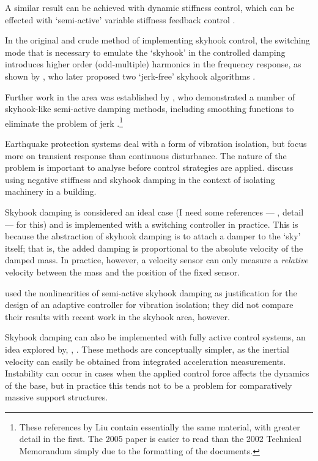 A similar result  can be achieved with dynamic stiffness control, which can be effected with `semi-active' variable stiffness feedback control \cite{leavitt2007}.

In the original and crude method of implementing skyhook control, the
switching mode that is necessary to emulate the `skyhook' in the controlled
damping introduces higher order (odd-multiple) harmonics in the frequency
response, as shown by \textcite{ahmadian2001}, who later proposed two
`jerk-free' skyhook algorithms \cite{ahmadian2004}.

Further work in the area was established by \textcite{liu2002}, who
demonstrated a number of skyhook-like semi-active damping methods, including
smoothing functions to eliminate the problem of jerk
\cite{liu2005}.\footnote{These references by Liu contain essentially the same
material, with greater detail in the first.
The 2005 paper is easier to read
than the 2002 Technical Memorandum simply due to the formatting of the
documents.}

Earthquake protection systems deal with a form of vibration isolation,
but focus more on transient response than continuous disturbance.
The
nature of the problem is important to analyse before control
strategies are applied.
\textcite{gavin2007} discuss using negative
stiffness and skyhook damping in the context of isolating machinery
in a building.

Skyhook damping is considered an ideal case (I need some references
— \ie, detail — for this) and is implemented with a switching
controller in practice.
This is because the abstraction of skyhook
damping is to attach a damper to the `sky' itself; that is, the added
damping is proportional to the absolute velocity of the damped
mass.
In practice, however, a velocity sensor can only measure a
\emph{relative} velocity between the mass and the position of the
fixed sensor.

\textcite{song2007} used the nonlinearities of semi-active skyhook damping as
justification for the design of an adaptive controller for vibration
isolation; they did not compare their results with recent work in the skyhook
area, however.

Skyhook damping can also be implemented with fully active control systems, an
idea explored by, \eg, \textcite{elliott2001,elliott2004,yan2006,kim2008a}
.
These methods are conceptually simpler, as the
inertial velocity can easily be obtained from integrated acceleration
measurements.
Instability can occur in cases when the applied control force
affects the dynamics of the base, but in practice this tends not to be a
problem for comparatively massive support structures.


